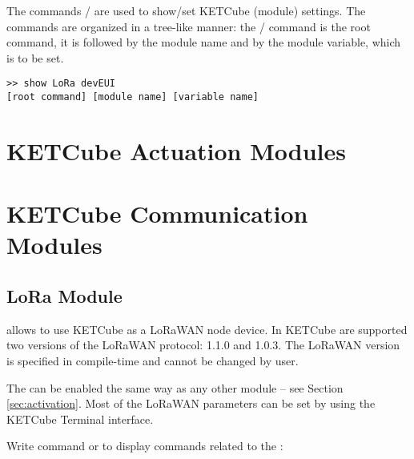 The commands / are used to show/set KETCube (module) settings. The commands are organized in a tree-like manner: the / command is the root command, it is followed by the module name and by the module variable, which is to be set. 

\begin{docCodeExample}
\begin{verbatim}
>> show LoRa devEUI
[root command] [module name] [variable name]
\end{verbatim}
\end{docCodeExample}


\clearpage
\section{KETCube Actuation Modules}
  
\clearpage
\section{KETCube Communication Modules}

\subsection{LoRa Module}
 allows to use KETCube as a LoRaWAN node device. In KETCube are supported two versions of the LoRaWAN protocol: 1.1.0 and 1.0.3. The LoRaWAN version is specified in compile-time and cannot be changed by user.

The  can be enabled the same way as any other module -- see Section \ref{sec:activation}. Most of the LoRaWAN parameters can be set by using the KETCube Terminal interface.

Write command  or  to display commands related to the :


